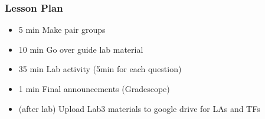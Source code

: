 \begin{frame}
    \frametitle{Lesson Plan}
    \begin{itemize}
        \item 5 min Make pair groups
        \item 10 min Go over guide lab material
        \item 35 min Lab activity (5min for each question) 
        \item 1 min Final announcements (Gradescope)
        \item (after lab) Upload Lab3 materials to google drive for LAs and TFs
    \end{itemize}
\end{frame}
    
